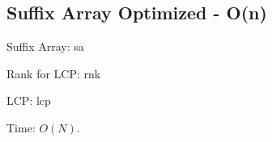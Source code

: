 \subsection{Suffix Array Optimized - O(n)}

Suffix Array: sa

Rank for LCP: rnk

LCP: lcp

Time: $O(N)$.

